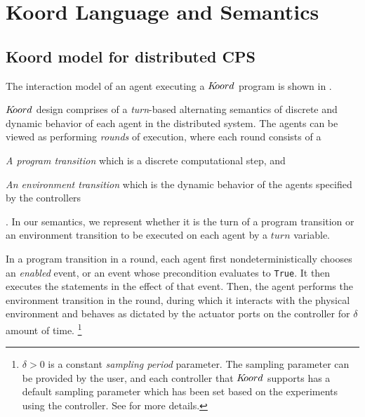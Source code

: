 \section{Koord Language and Semantics}
\subsection{Koord model for distributed CPS}

The interaction model of an agent executing a $K\kern-2pt oord$ program is shown in . 

$K\kern-2pt oord$ design comprises of a \emph{turn}-based alternating semantics of discrete and dynamic behavior of each agent in the distributed system. The agents can be viewed as performing \emph{rounds} of execution, where each round consists of a \begin{inparaenum} \item \emph{A program transition} which is a discrete computational step, and \item \emph{An environment transition} which is the dynamic behavior of the agents specified by the controllers \end{inparaenum}. In our semantics, we represent whether it is the turn of a program transition or an environment transition to be executed on each agent by a $\mathit{turn}$ variable.  

In a program transition in a round, each agent first nondeterministically chooses an \emph{enabled} event, or an event whose precondition evaluates to \verb|True|. It then executes the statements in the effect of that event. %
Then, the agent performs the environment transition in the round, during which it interacts with the physical environment and behaves as dictated by the actuator ports on the controller for $\delta$ amount of time.  \footnote{ $\delta>0$ is a constant \emph{sampling period} parameter. The sampling parameter can be provided by the user, and each controller that $K\kern-2pt oord$ supports has a default sampling parameter which has been set based on the experiments using the controller. See  for more details.}  %

